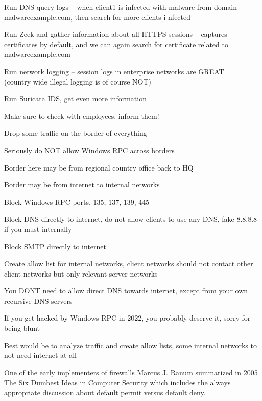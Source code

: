 \documentclass[Screen16to9,17pt]{foils}
\begin{document}
\begin{list2}
\item Run DNS query logs -- when client1 is infected with malware from domain malwareexample.com, then search for more clients i
nfected
\item Run Zeek and gather information about all HTTPS sessions -- captures certificates by default, and we can again search for
certificate related to malwareexample.com
\item Run network logging -- session logs in enterprise networks are GREAT \\
(country wide illegal logging is of course NOT)
\item Run Suricata IDS, get even more information
\end{list2}

Make sure to check with employees, inform them!


\begin{list2}
\item Drop some traffic on the border of everything
\item Seriously do NOT allow Windows RPC across borders
\item Border here may be from regional country office back to HQ
\item Border may be from internet to internal networks
\item Block Windows RPC ports, 135, 137, 139, 445
\item Block DNS directly to internet, do not allow clients to use any DNS, fake 8.8.8.8 if you must internally
\item Block SMTP directly to internet
\item Create allow list for internal networks, client networks should not contact other client networks but only relevant server networks
\end{list2}

You DONT need to allow direct DNS towards internet, except from your own recursive DNS servers

If you get hacked by Windows RPC in 2022, you probably deserve it, sorry for being blunt

Best would be to analyze traffic and create allow lists, some internal networks to not need internet at all




One of the early implementers of firewalls Marcus J. Ranum summarized in 2005 The Six Dumbest Ideas in Computer Security  which includes the always appropriate discussion about default permit versus default deny.
\end{document}
